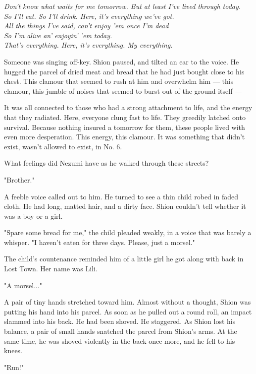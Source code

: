 \myspace

\emph{Don't know what waits for me tomorrow. But at least I've lived through
today.\\
So I'll eat. So I'll drink. Here, it's everything we've got.\\
All the things I've said, can't enjoy 'em once I'm dead\\
So I'm alive an' enjoyin' 'em today.\\
That's everything. Here, it's everything. My everything.}

\myspace

Someone was singing off-key. Shion paused, and tilted an ear to the
voice. He hugged the parcel of dried meat and bread that he had just
bought close to his chest. This clamour that seemed to rush at him and
overwhelm him ― this clamour, this jumble of noises that seemed to burst
out of the ground itself ―

It was all connected to those who had a strong attachment to life, and
the energy that they radiated. Here, everyone clung fast to life. They
greedily latched onto survival. Because nothing insured a tomorrow for
them, these people lived with even more desperation. This energy, this
clamour. It was something that didn't exist, wasn't allowed to exist, in
No. 6.

What feelings did Nezumi have as he walked through these streets?

"Brother."

A feeble voice called out to him. He turned to see a thin child robed in
faded cloth. He had long, matted hair, and a dirty face. Shion couldn't
tell whether it was a boy or a girl.

"Spare some bread for me," the child pleaded weakly, in a voice that was
barely a whisper. "I haven't eaten for three days. Please, just a
morsel."

The child's countenance reminded him of a little girl he got along with
back in Lost Town. Her name was Lili.

"A morsel..."

A pair of tiny hands stretched toward him. Almost without a thought,
Shion was putting his hand into his parcel. As soon as he pulled out a
round roll, an impact slammed into his back. He had been shoved. He
staggered. As Shion lost his balance, a pair of small hands snatched the
parcel from Shion's arms. At the same time, he was shoved violently in
the back once more, and he fell to his knees.

"Run!"

